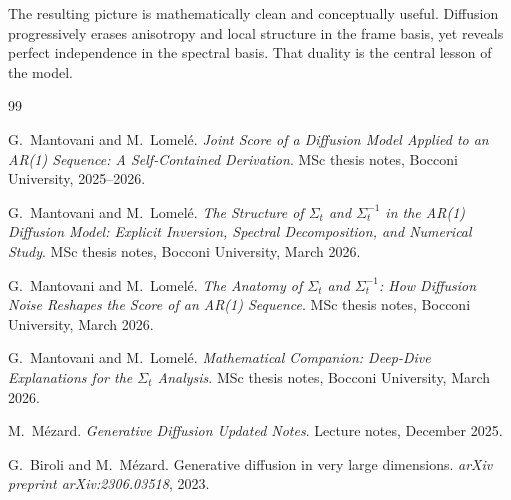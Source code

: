 \documentclass[11pt]{article}
\numberwithin{equation}{section}
\theoremstyle{definition}
\theoremstyle{remark}
\begin{document}
The resulting picture is mathematically clean and conceptually useful. Diffusion progressively erases anisotropy and local structure in the frame basis, yet reveals perfect independence in the spectral basis. That duality is the central lesson of the model.

\begin{thebibliography}{99}

G.~Mantovani and M.~Lomel\'e.
\newblock \emph{Joint Score of a Diffusion Model Applied to an AR(1) Sequence: A Self-Contained Derivation}.
\newblock MSc thesis notes, Bocconi University, 2025--2026.

G.~Mantovani and M.~Lomel\'e.
\newblock \emph{The Structure of $\Sigma_t$ and $\Sigma_t^{-1}$ in the AR(1) Diffusion Model: Explicit Inversion, Spectral Decomposition, and Numerical Study}.
\newblock MSc thesis notes, Bocconi University, March 2026.

G.~Mantovani and M.~Lomel\'e.
\newblock \emph{The Anatomy of $\Sigma_t$ and $\Sigma_t^{-1}$: How Diffusion Noise Reshapes the Score of an AR(1) Sequence}.
\newblock MSc thesis notes, Bocconi University, March 2026.

G.~Mantovani and M.~Lomel\'e.
\newblock \emph{Mathematical Companion: Deep-Dive Explanations for the $\Sigma_t$ Analysis}.
\newblock MSc thesis notes, Bocconi University, March 2026.

M.~M\'ezard.
\newblock \emph{Generative Diffusion Updated Notes}.
\newblock Lecture notes, December 2025.

G.~Biroli and M.~M\'ezard.
\newblock Generative diffusion in very large dimensions.
\newblock \emph{arXiv preprint arXiv:2306.03518}, 2023.

\end{thebibliography}
\end{document}
